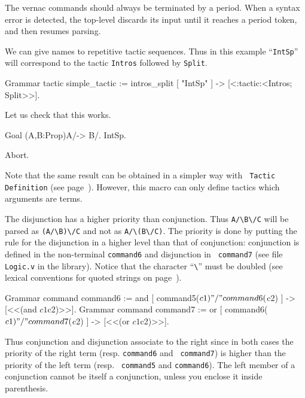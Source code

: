 \Rem
The vernac commands should always be terminated by a period. When a
syntax error is detected, the top-level discards its input until it
reaches a period token, and then resumes parsing.


We can give names to repetitive tactic sequences. Thus in this example
``{\tt IntSp}'' will correspond to the tactic {\tt Intros} followed by
{\tt Split}.

\begin{coq_example}
Grammar tactic simple_tactic :=
  intros_split [ "IntSp" ] -> [<:tactic:<Intros; Split>>].
\end{coq_example}

Let us check that this works.

\begin{coq_example}
Goal (A,B:Prop)A/\B -> B/\A.
IntSp.
\end{coq_example}
\begin{coq_eval}
Abort.
\end{coq_eval}

Note that the same result can be obtained in a simpler way with {\tt
Tactic Definition} (see page~\pageref{TacticDefinition}). However,
this macro can only define tactics which arguments are terms.



The disjunction has a higher priority than conjunction.  Thus
\verb+A/\B\/C+ will be parsed as \verb+(A/\B)\/C+ and not as
\verb+A/\(B\/C)+. The priority is done by putting the rule for the
disjunction in a higher level than that of conjunction: conjunction is
defined in the non-terminal {\tt command6} and disjunction in {\tt
command7} (see file {\tt Logic.v} in the library). Notice that
the character ``\verb+\+'' must be doubled (see lexical conventions
for quoted strings on page~\pageref{lexical}).

\begin{coq_example*}
Grammar command command6 := 
  and [ command5($c1) "/\\" command6($c2) ] -> [<<(and $c1 $c2)>>].
Grammar command command7 :=
  or  [ command6($c1) "\\/" command7($c2) ] -> [<<(or $c1 $c2)>>].
\end{coq_example*}

Thus conjunction and disjunction associate to the right since in both
cases the priority of the right term (resp. {\tt command6} and {\tt
command7}) is higher than the priority of the left term (resp. {\tt
command5} and {\tt command6}). The left member of a conjunction cannot
be itself a conjunction, unless you enclose it inside parenthesis.

